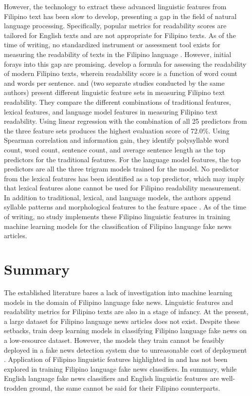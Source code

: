 However, the technology to extract these advanced linguistic features from Filipino text has been slow to develop, presenting a gap in the field of natural language processing. Specifically, popular metrics for readability scores are tailored for English texts and are not appropriate for Filipino texts. As of the time of writing, no standardized instrument or assessment tool exists for measuring the readability of texts in the Filipino language \cite{imperial-2020}. However, initial forays into this gap are promising.  develop a formula for assessing the readability of modern Filipino texts, wherein readability score is a function of word count and words per sentence.  and  (two separate studies conducted by the same authors) present different linguistic feature sets in measuring Filipino text readability. They compare the different combinations of traditional features, lexical features, and language model features in measuring Filipino text readability. Using linear regression with the combination of all 25 predictors from the three feature sets produces the highest evaluation score of 72.0\%. Using Spearman correlation and information gain, they identify polysyllable word count, word count, sentence count, and average sentence length as the top predictors for the traditional features. For the language model features, the top predictors are all the three trigram models trained for the model. No predictor from the lexical features has been identified as a top predictor, which may imply that lexical features alone cannot be used for Filipino readability measurement. In addition to traditional, lexical, and language models, the authors append syllable patterns and morphological features to the feature space \cite{imperial-2021, imperial-2020}. As of the time of writing, no study implements these Filipino linguistic features in training machine learning models for the classification of Filipino language fake news articles.

\section{Summary}

The established literature bares a lack of investigation into machine learning models in the domain of Filipino language fake news. Linguistic features and readability metrics for Filipino texts are also in a stage of infancy. At the present, a large dataset for Filipino language news articles does not exist. Despite these setbacks,  train deep learning models in classifying Filipino language fake news on a low-resource dataset. However, the models they train cannot be feasibly deployed in a fake news detection system due to unreasonable cost of deployment \cite{paleyes-2022}. Application of Filipino linguistic features highlighted in  and  has not been explored in training Filipino language fake news classifiers. In summary, while English language fake news classifiers and English linguistic features are well-trodden ground, the same cannot be said for their Filipino counterparts.